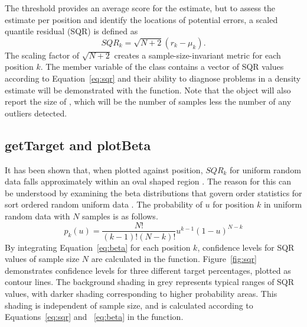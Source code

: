The threshold provides an average score for the estimate, but to assess the estimate per position and identify the locations of potential errors, a scaled quantile residual (SQR) is defined as
\begin{equation} \label{eq:sqr}
SQR_k=\sqrt{N+2} \left(r_k-\mu_k\right).
\end{equation}
The scaling factor of $\sqrt{N+2}$ creates a sample-size-invariant metric for each position $k$. The  member variable of the  class contains a vector of SQR values according to Equation~\ref{eq:sqr} and their ability to diagnose problems in a density estimate will be demonstrated with the  function. Note that the  object will also report the size of , which will be the number of samples less the number of any outliers detected.

\subsection{getTarget and plotBeta} \label{beta}

It has been shown that, when plotted against position, $SQR_k$ for uniform random data falls approximately within an oval shaped region \citep{PDFe2}. The reason for this can be understood by examining the beta distributions that govern order statistics for sort ordered random uniform data \citep{order}. The probability of $u$ for position $k$ in uniform random data with $N$ samples is as follows.
\begin{equation} \label{eq:beta}
p_k(u)=\frac{N!}{\left(k-1\right)!\left(N-k\right)!}u^{k-1}\left(1-u\right)^{N-k}
\end{equation}
By integrating Equation~\ref{eq:beta} for each position $k$, confidence levels for SQR values of sample size $N$ are calculated in the  function. Figure~\ref{fig:sqr} demonstrates confidence levels for three different target percentages, plotted as contour lines. The background shading in grey represents typical ranges of SQR values, with darker shading corresponding to higher probability areas. This shading is independent of sample size, and is calculated according to Equations~\ref{eq:sqr} and ~\ref{eq:beta} in the  function.


